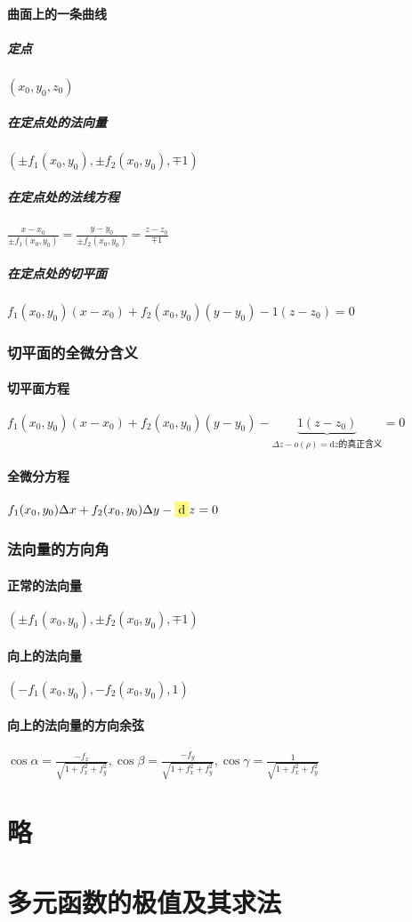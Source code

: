 \documentclass[UTF8,a4paper,12pt,scheme=chinese]{ctexbook}
\newcommand{\ud}{\mathrm{d}}
\newcommand{\hla}[1]{%
	\colorbox{yellow!50}{$\displaystyle#1$}}
\theoremstyle{plain}
\begin{document}
	\paragraph{曲面上的一条曲线}
	\subparagraph{定点} $(x_0,y_0,z_0)$
	\subparagraph{在定点处的法向量}$ (\pm f_1(x_0,y_0),\pm f_2(x_0,y_0),\mp 1) $
	\subparagraph{在定点处的法线方程}$\frac{x-x_0}{\pm f_1(x_0,y_0)}=\frac{y-y_0}{\pm f_2(x_0,y_0)}=\frac{z-z_0}{\mp 1}$
	\subparagraph{在定点处的切平面}$ f_1(x_0,y_0)(x-x_0)+f_2(x_0,y_0)(y-y_0)-1(z-z_0)=0 $
	\subsubsection{切平面的全微分含义}
	\paragraph{切平面方程}$ f_1(x_0,y_0)(x-x_0)+f_2(x_0,y_0)(y-y_0)-\underbrace{1(z-z_0)}_{\displaystyle\Delta z - o(\rho)=\ud z\mbox{的真正含义}}=0 $
	\paragraph{全微分方程}$ f_1(x_0,y_0)\Delta x+f_2(x_0,y_0)\Delta y-\hla{\ud} z=0 $
	\subsubsection{法向量的方向角}
	\paragraph{正常的法向量}$ (\pm f_1(x_0,y_0),\pm f_2(x_0,y_0),\mp 1) $
	\paragraph{向上的法向量}$ (-f_1(x_0,y_0),-f_2(x_0,y_0),1) $
	\paragraph{向上的法向量的方向余弦}$ 
	\cos\alpha = \frac{-f_x}{\sqrt{1+f_x^2+f_y^2}},
	\cos\beta = \frac{-f_y}{\sqrt{1+f_x^2+f_y^2}},
	\cos\gamma = \frac{1}{\sqrt{1+f_x^2+f_y^2}} $
	\section{略}
	\section{多元函数的极值及其求法}
\end{document}
